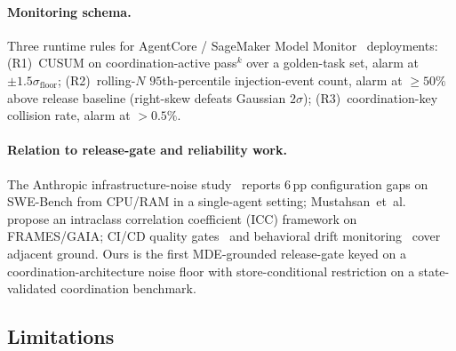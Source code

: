 \paragraph{Monitoring schema.}
Three runtime rules for AgentCore / SageMaker Model
Monitor~\cite{sagemaker_monitor2022} deployments:
(R1)~CUSUM on coordination-active pass$^k$ over a golden-task
set, alarm at $\pm 1.5\sigma_{\textrm{floor}}$;
(R2)~rolling-$N$ $95$th-percentile injection-event count, alarm
at $\geq 50\%$ above release baseline (right-skew defeats
Gaussian $2\sigma$);
(R3)~coordination-key collision rate, alarm at $>0.5\%$.

\paragraph{Relation to release-gate and reliability work.}
The Anthropic infrastructure-noise
study~\cite{anthropicnoise2026} reports $6$\,pp configuration
gaps on SWE-Bench from CPU/RAM in a single-agent setting;
Mustahsan~et~al.~\cite{mustahsan2025stochasticity} propose an
intraclass correlation coefficient (ICC) framework on
FRAMES/GAIA; CI/CD quality
gates~\cite{selftestquality2026} and behavioral drift
monitoring~\cite{agentdrift2026} cover adjacent ground. Ours is
the first MDE-grounded release-gate keyed on a
coordination-architecture noise floor with store-conditional
restriction on a state-validated coordination benchmark.

\subsection{Limitations}
\label{sec:eval:limits}

